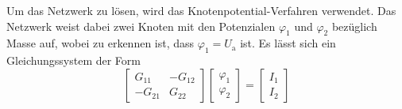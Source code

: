 Um das Netzwerk zu lösen, wird das Knotenpotential-Verfahren verwendet. Das Netzwerk weist dabei zwei Knoten mit den Potenzialen $\varphi_1$ und $\varphi_2$ bezüglich Masse auf, wobei zu erkennen ist, dass $\varphi_1 = U_\text{a}$ ist. Es lässt sich ein Gleichungssystem der Form
\begin{equation}
    \begin{bmatrix}
        G_{11} & -G_{12} \\  -G_{21} & G_{22} 
    \end{bmatrix} \begin{bmatrix}
        \varphi_1 \\ \varphi_2 
    \end{bmatrix} = \begin{bmatrix}
        I_1 \\ I_2 
    \end{bmatrix}
\end{equation}


